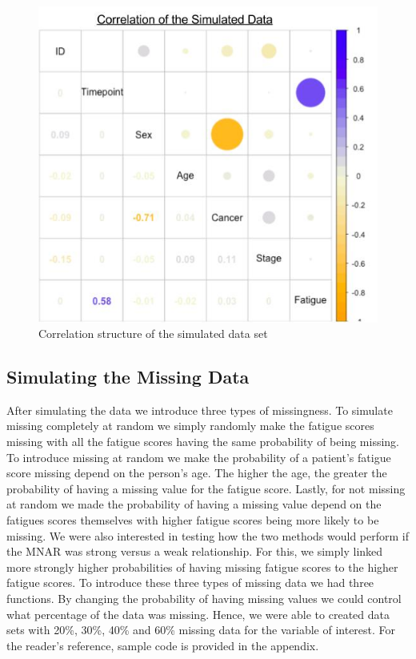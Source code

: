 \documentclass[fleqn,10pt]{wlscirep}\usepackage[]{graphicx}\usepackage[]{color}
\begin{document}
\begin{figure}[H]
\centering
\includegraphics[width=\linewidth]{corr_sim_data}
\caption{Correlation structure of the simulated data set}
\label{fig:corr_sim_data}
\end{figure}


\subsection{Simulating the Missing Data}

After simulating the data we introduce three types of missingness. To simulate missing completely at random we simply randomly make the fatigue scores missing with all the fatigue scores having the same probability of being missing. To introduce missing at random we make the probability of a patient's fatigue score missing depend on the person's age. The higher the age, the greater the probability of having a missing value for the fatigue score. Lastly, for not missing at random we made the probability of having a missing value depend on the fatigues scores themselves with higher fatigue scores being more likely to be missing. We were also interested in testing how the two methods would perform if the MNAR was strong versus a weak relationship. For this, we simply linked more strongly higher probabilities of having missing fatigue scores to the higher fatigue scores. To introduce these three types of missing data we had three functions. By changing the probability of having missing values we could control what percentage of the data was missing. Hence, we were able to created data sets with 20\%, 30\%, 40\% and 60\% missing data for the variable of interest. For the reader's reference, sample code is provided in the appendix. 
\end{document}
